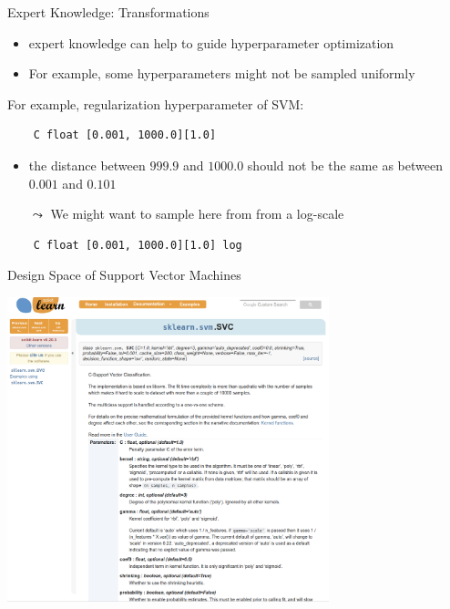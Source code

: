 \begin{frame}[c, fragile]{Expert Knowledge: Transformations}

\begin{itemize}
	\item expert knowledge can help to guide hyperparameter optimization
	\item For example, some hyperparameters might not be sampled uniformly
\end{itemize}

\pause
\medskip
For example, regularization hyperparameter of SVM:

\begin{verbatim}
    C float [0.001, 1000.0][1.0]
\end{verbatim}

\begin{itemize}
	\item the distance between $999.9$ and $1000.0$ should not be the same as between $0.001$ and $0.101$
	\smallskip
	\pause
	\item[$\leadsto$] We might want to sample here from from a log-scale
\end{itemize}

\begin{verbatim}
    C float [0.001, 1000.0][1.0] log
\end{verbatim}

\end{frame}
\begin{frame}[c]{Design Space of Support Vector Machines}

\centering
\includegraphics[width=0.7\textwidth]{images/sklearn_svm_doc.png}

\end{frame}
